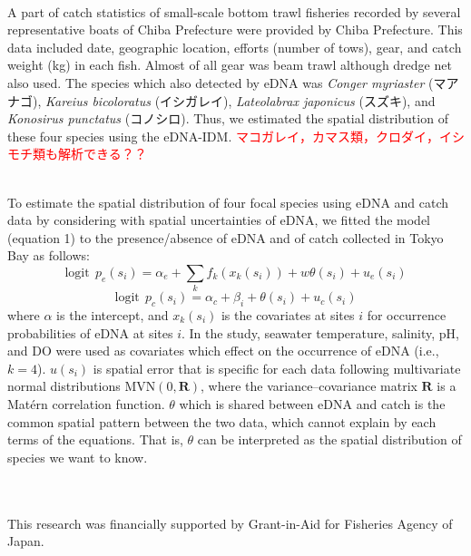 \documentclass[12pt]{article}
\begin{document}
\begin{linenumbers}
\\
A part of catch statistics of small-scale bottom trawl fisheries recorded by several representative boats of Chiba Prefecture were provided by Chiba Prefecture. This data included date, geographic location, efforts (number of tows), gear, and catch weight (kg) in each fish. Almost of all gear was beam trawl although dredge net also used. The species which also detected by eDNA was \textit{Conger myriaster} (マアナゴ), \textit{Kareius bicoloratus} (イシガレイ), \textit{Lateolabrax japonicus} (スズキ), and \textit{Konosirus punctatus} (コノシロ). Thus, we estimated the spatial distribution of these four species using the eDNA-IDM. \textcolor{red}{マコガレイ，カマス類，クロダイ，イシモチ類も解析できる？？}

\\
To estimate the spatial distribution of four focal species using eDNA and catch data by considering with spatial  uncertainties of eDNA, we fitted the model (equation 1) to the presence/absence of eDNA and of catch collected in Tokyo Bay as follows:
\[
\mathrm{logit} \ \ p_{e}(s_{i}) = \alpha_{e} + \sum_{k}f_{k}(x_{k}(s_{i})) + w \theta(s_{i}) + u_{e}(s_{i})
\]
\[
\mathrm{logit} \ \ p_{c}(s_{i}) = \alpha_{c} + \beta_{i} + \theta(s_{i}) + u_{c}(s_{i})
\]
where $\alpha$ is the intercept, and $x_{k}(s_{i})$ is the covariates at sites $i$ for occurrence probabilities of eDNA at sites $i$. In the study, seawater temperature, salinity, pH, and DO were used as covariates which effect on the occurrence of eDNA (i.e., $k = 4$). $u(s_{i})$ is spatial error that is specific for each data following multivariate normal distributions $\mathrm{MVN}(0, \mathbf{R})$, where the variance--covariance matrix $\mathbf{R}$ is a Mat\'{e}rn correlation function. $\theta$ which is shared between eDNA and catch is the common spatial pattern between the two data, which cannot explain by each terms of the equations. That is, $\theta$ can be interpreted as the spatial distribution of species we want to know.





\ \\
\\
This research was financially supported by Grant-in-Aid for Fisheries Agency of Japan.
\ \\


\end{linenumbers}
\end{document}
